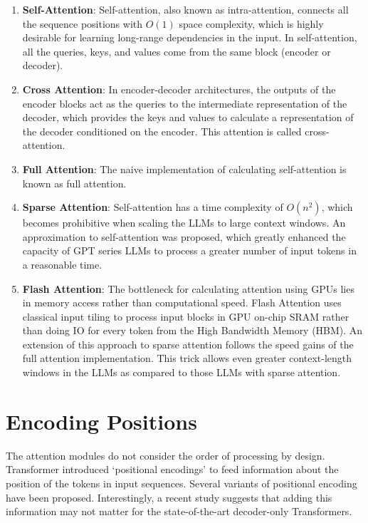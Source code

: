 \documentclass[a4paper,oneside]{book}
\begin{document}
\begin{enumerate}
  \item \textbf{Self-Attention}: Self-attention, also known as intra-attention, connects all the sequence positions with $O(1)$ space complexity, which is highly desirable for learning long-range dependencies in the input. In self-attention, all the queries, keys, and values come from the same block (encoder or decoder).

  \item \textbf{Cross Attention}: In encoder-decoder architectures, the outputs of the encoder blocks act as the queries to the intermediate representation of the decoder, which provides the keys and values to calculate a representation of the decoder conditioned on the encoder. This attention is called cross-attention.

  \item \textbf{Full Attention}: The naive implementation of calculating self-attention is known as full attention.

  \item \textbf{Sparse Attention}: Self-attention has a time complexity of $O(n^2)$, which becomes prohibitive when scaling the LLMs to large context windows. An approximation to self-attention was proposed, which greatly enhanced the capacity of GPT series LLMs to process a greater number of input tokens in a reasonable time.

  \item \textbf{Flash Attention}: The bottleneck for calculating attention using GPUs lies in memory access rather than computational speed. Flash Attention uses classical input tiling to process input blocks in GPU on-chip SRAM rather than doing IO for every token from the High Bandwidth Memory (HBM). An extension of this approach to sparse attention follows the speed gains of the full attention implementation. This trick allows even greater context-length windows in the LLMs as compared to those LLMs with sparse attention.
\end{enumerate}

\section{Encoding Positions}
The attention modules do not consider the order of processing by design. Transformer introduced `positional encodings' to feed information about the position of the tokens in input sequences. Several variants of positional encoding have been proposed. Interestingly, a recent study suggests that adding this information may not matter for the state-of-the-art decoder-only Transformers.
\end{document}
